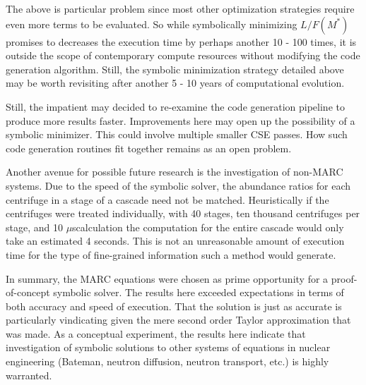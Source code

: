 \documentclass[preprint,12pt]{elsarticle}
\newcommand{\us}[0]{$\mu$s}
\begin{document}
The above is particular problem since most other optimization strategies require
even more terms to be evaluated.  So while symbolically minimizing $L/F(M^*)$ promises
to decreases the execution time by perhaps another 10 - 100 times, it is 
outside the scope of contemporary compute resources without modifying the 
code generation algorithm.  Still, the symbolic minimization strategy detailed above
may be worth revisiting after another 5 - 10 years of computational evolution.

Still, the impatient may decided to re-examine the code generation pipeline to 
produce more results faster.  Improvements here may open up the possibility of
a symbolic minimizer.  This could involve multiple smaller CSE passes.  How 
such code generation routines fit together remains as an open problem.

Another avenue for possible future research is the investigation of non-MARC 
systems.  Due to the speed of the symbolic solver, the abundance ratios for 
each centrifuge in a stage of a cascade need not be matched.  Heuristically
if the centrifuges were treated individually, with 40 stages, ten thousand 
centrifuges per stage, and 10 \us calculation the computation for the entire
cascade would only take an estimated 4 seconds.  This is not an unreasonable 
amount of execution time for the type of fine-grained information such a 
method would generate.  

In summary, the MARC equations were chosen as prime opportunity for a 
proof-of-concept symbolic solver.  The results here exceeded expectations in terms
of both accuracy and speed of execution.  That the solution is just as accurate 
is particularly vindicating given the mere second order Taylor approximation that 
was made.  As a conceptual experiment, the results here indicate that
investigation of symbolic solutions to other systems of equations in 
nuclear engineering (Bateman, neutron diffusion, neutron transport, etc.) is
highly warranted.


\end{document}
